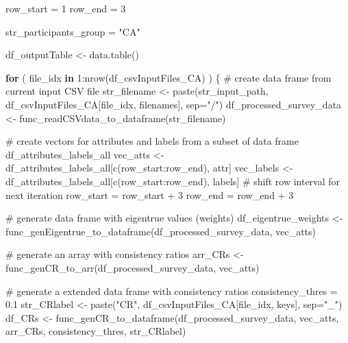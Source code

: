 \documentclass[
]{article}
\newenvironment{Shaded}{\begin{snugshade}}{\end{snugshade}}
\newcommand{\AttributeTok}[1]{\textcolor[rgb]{0.00,0.34,0.68}{#1}}
\newcommand{\CommentTok}[1]{\textcolor[rgb]{0.54,0.53,0.53}{#1}}
\newcommand{\ControlFlowTok}[1]{\textcolor[rgb]{0.12,0.11,0.11}{\textbf{#1}}}
\newcommand{\DecValTok}[1]{\textcolor[rgb]{0.69,0.50,0.00}{#1}}
\newcommand{\FloatTok}[1]{\textcolor[rgb]{0.69,0.50,0.00}{#1}}
\newcommand{\FunctionTok}[1]{\textcolor[rgb]{0.39,0.29,0.61}{#1}}
\newcommand{\NormalTok}[1]{\textcolor[rgb]{0.12,0.11,0.11}{#1}}
\newcommand{\OtherTok}[1]{\textcolor[rgb]{0.00,0.43,0.16}{#1}}
\newcommand{\SpecialCharTok}[1]{\textcolor[rgb]{0.24,0.68,0.91}{#1}}
\newcommand{\StringTok}[1]{\textcolor[rgb]{0.75,0.01,0.01}{#1}}
\begin{document}
\begin{Shaded}
\begin{Highlighting}[]
\NormalTok{row\_start }\OtherTok{=} \DecValTok{1}
\NormalTok{row\_end }\OtherTok{=} \DecValTok{3}

\NormalTok{str\_participants\_group }\OtherTok{=} \StringTok{"CA"}

\NormalTok{df\_outputTable }\OtherTok{\textless{}{-}} \FunctionTok{data.table}\NormalTok{()}

\ControlFlowTok{for}\NormalTok{ ( file\_idx }\ControlFlowTok{in} \DecValTok{1}\SpecialCharTok{:}\FunctionTok{nrow}\NormalTok{(df\_csvInputFiles\_CA) ) \{}
  \CommentTok{\# create data frame from current input CSV file}
\NormalTok{  str\_filename }\OtherTok{\textless{}{-}} \FunctionTok{paste}\NormalTok{(str\_input\_path, df\_csvInputFiles\_CA[file\_idx, filenames], }\AttributeTok{sep=}\StringTok{"/"}\NormalTok{)}
\NormalTok{  df\_processed\_survey\_data }\OtherTok{\textless{}{-}} \FunctionTok{func\_readCSVdata\_to\_dataframe}\NormalTok{(str\_filename)}
  
  \CommentTok{\# create vectors for attributes and labels from a subset of data frame \textquotesingle{}df\_attributes\_labels\_all\textquotesingle{}}
\NormalTok{  vec\_atts }\OtherTok{\textless{}{-}}\NormalTok{ df\_attributes\_labels\_all[}\FunctionTok{c}\NormalTok{(row\_start}\SpecialCharTok{:}\NormalTok{row\_end), attr]}
\NormalTok{  vec\_labels }\OtherTok{\textless{}{-}}\NormalTok{ df\_attributes\_labels\_all[}\FunctionTok{c}\NormalTok{(row\_start}\SpecialCharTok{:}\NormalTok{row\_end), labels]}
  \CommentTok{\# shift row interval for next iteration}
\NormalTok{  row\_start }\OtherTok{=}\NormalTok{ row\_start }\SpecialCharTok{+} \DecValTok{3}
\NormalTok{  row\_end }\OtherTok{=}\NormalTok{ row\_end }\SpecialCharTok{+} \DecValTok{3}
  
  \CommentTok{\# generate data frame with eigentrue values (weights) }
\NormalTok{  df\_eigentrue\_weights }\OtherTok{\textless{}{-}} \FunctionTok{func\_genEigentrue\_to\_dataframe}\NormalTok{(df\_processed\_survey\_data, vec\_atts)}
  
  \CommentTok{\# generate an array with consistency ratios}
\NormalTok{  arr\_CRs }\OtherTok{\textless{}{-}} \FunctionTok{func\_genCR\_to\_arr}\NormalTok{(df\_processed\_survey\_data, vec\_atts)}

  \CommentTok{\# generate a extended data frame with consistency ratios}
\NormalTok{  consistency\_thres }\OtherTok{=} \FloatTok{0.1}
\NormalTok{  str\_CRlabel }\OtherTok{\textless{}{-}} \FunctionTok{paste}\NormalTok{(}\StringTok{"CR"}\NormalTok{, df\_csvInputFiles\_CA[file\_idx, keys], }\AttributeTok{sep=}\StringTok{"\_"}\NormalTok{)}
\NormalTok{  df\_CRs }\OtherTok{\textless{}{-}} \FunctionTok{func\_genCR\_to\_dataframe}\NormalTok{(df\_processed\_survey\_data, vec\_atts, arr\_CRs, consistency\_thres, str\_CRlabel)}
  

\end{Highlighting}
\end{Shaded}
\end{document}
